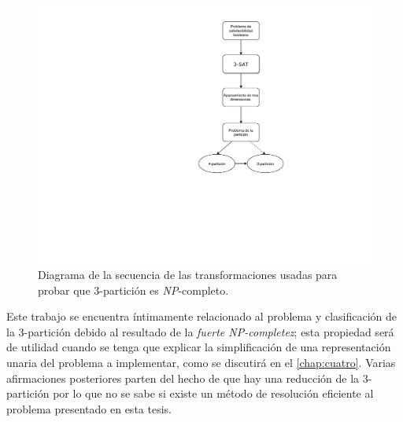 \begin{figure}[h]
\centering
\includegraphics[width=.45\textwidth,keepaspectratio,trim={12cm 6cm 7cm 0cm}]{./images/2_2_1.pdf}
\caption{Diagrama de la secuencia de las transformaciones usadas para
probar que 3-partición es \textsl{NP}-completo.}
\label{fig:secuenciaNP}
\end{figure}

Este trabajo se encuentra íntimamente relacionado al problema y clasificación de
la 3-partición debido al resultado de la \textit{fuerte \textsl{NP}-completez};
esta propiedad será de utilidad cuando se tenga que explicar la simplificación de
una representación unaria del problema a implementar, como se discutirá en el
\cref{chap:cuatro}. Varias afirmaciones posteriores parten del hecho de que
hay una reducción de la 3-partición por lo que no se sabe si existe un método de
resolución eficiente al problema presentado en esta tesis.

